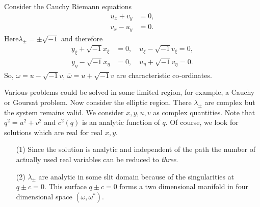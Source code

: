 \medskip
{}
Consider the Cauchy Riemann equations
\begin{align*}
u_x + v_y & = 0,\\
v_x - u_y & = 0. 
\end{align*}
Here\pageoriginale $\lambda_\pm = \pm \sqrt{-1}$ and therefore
\begin{align*}
y_\xi + \sqrt{-1} x_\xi & = 0, \quad u_\xi - \sqrt{-1} v_\xi = 0,\\
y_\eta - \sqrt{-1} x_\eta & = 0, \quad u_\eta + \sqrt{-1} v_\eta =0.
\end{align*}
So, $\omega = u - \sqrt{-1} v$, $\bar{\omega} = u + \sqrt{-1} v$ are characteristic co-ordinates.

\begin{note*}
Various problems could be solved in some limited region, for example, a Cauchy or Goursat problem. Now consider the elliptic region. There $\lambda_\pm$ are complex but the system remains valid. We consider $x,y,u,v$ as complex quantities. Note that $q^2 = u^2 + v^2$ and $c^2 (q)$ is an analytic function of $q$. Of course, we look for solutions which are real for real $x,y$.
\end{note*}

\begin{remarks*}
\begin{itemize}
\item[\rm{(1)}] Since the solution is analytic and independent of the path the number of actually used real variables can be reduced to {\em three}.

\item[\rm{(2)}] $\lambda_{\pm}$ are analytic in some slit domain because of the singularities at $q \pm c = 0$. This surface $q \pm c =0$ forms a two dimensional manifold in four dimensional space $(\omega, \omega^*)$. 
\end{itemize}
\end{remarks*}

